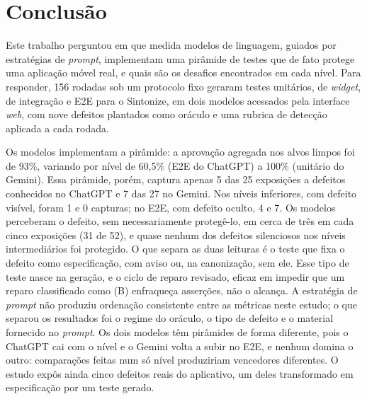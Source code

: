 \documentclass[12pt]{article}
\begin{document}
\section{Conclusão}
\label{sec:conclusao}

Este trabalho perguntou em que medida modelos de linguagem, guiados por
estratégias de \textit{prompt}, implementam uma pirâmide de testes que de
fato protege uma aplicação móvel real, e quais são os desafios encontrados em
cada nível. Para responder, 156 rodadas sob um protocolo fixo geraram testes
unitários, de \textit{widget}, de integração e E2E para o Sintonize, em dois
modelos acessados pela interface \textit{web}, com nove defeitos plantados
como oráculo e uma rubrica de detecção aplicada a cada rodada.

Os modelos implementam a pirâmide: a aprovação agregada nos alvos limpos foi
de 93\%, variando por nível de 60,5\% (E2E do ChatGPT) a 100\% (unitário do
Gemini). Essa pirâmide, porém, captura apenas 5 das 25 exposições a defeitos
conhecidos no ChatGPT e 7 das 27 no Gemini. Nos níveis inferiores, com
defeito visível, foram 1 e 0 capturas; no E2E, com defeito oculto, 4 e 7. Os
modelos perceberam o defeito, sem necessariamente protegê-lo, em cerca de
três em cada cinco exposições (31 de 52), e quase nenhum dos defeitos
silenciosos nos níveis intermediários foi protegido. O que separa as duas
leituras é o teste que fixa o defeito como especificação, com aviso ou, na
canonização, sem ele. Esse tipo de teste nasce na geração, e o ciclo de
reparo revisado, eficaz em impedir que um reparo classificado como (B)
enfraqueça asserções, não o alcança. A estratégia de \textit{prompt} não
produziu ordenação consistente entre as métricas neste estudo; o que separou
os resultados foi o regime do oráculo, o tipo de defeito e o material
fornecido no \textit{prompt}. Os dois modelos têm pirâmides de forma
diferente, pois o ChatGPT cai com o nível e o Gemini volta a subir no E2E, e
nenhum domina o outro: comparações feitas num só nível produziriam vencedores
diferentes. O estudo expôs ainda cinco defeitos reais do aplicativo, um deles
transformado em especificação por um teste gerado.
\end{document}

